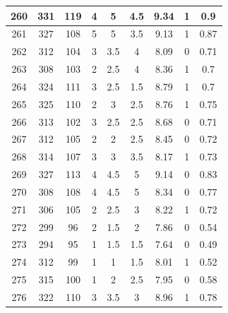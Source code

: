 \documentclass[11pt]{article}
\begin{document}
\begin{appendix}
\begin{longtable}[H]{|c|c|c|c|c|c|c|c|c|}
	260        & 331       & 119         & 4                 & 5   & 4.5 & 9.34 & 1        & 0.9             \\ \hline
	261        & 327       & 108         & 5                 & 5   & 3.5 & 9.13 & 1        & 0.87            \\ \hline
	262        & 312       & 104         & 3                 & 3.5 & 4   & 8.09 & 0        & 0.71            \\ \hline
	263        & 308       & 103         & 2                 & 2.5 & 4   & 8.36 & 1        & 0.7             \\ \hline
	264        & 324       & 111         & 3                 & 2.5 & 1.5 & 8.79 & 1        & 0.7             \\ \hline
	265        & 325       & 110         & 2                 & 3   & 2.5 & 8.76 & 1        & 0.75            \\ \hline
	266        & 313       & 102         & 3                 & 2.5 & 2.5 & 8.68 & 0        & 0.71            \\ \hline
	267        & 312       & 105         & 2                 & 2   & 2.5 & 8.45 & 0        & 0.72            \\ \hline
	268        & 314       & 107         & 3                 & 3   & 3.5 & 8.17 & 1        & 0.73            \\ \hline
	269        & 327       & 113         & 4                 & 4.5 & 5   & 9.14 & 0        & 0.83            \\ \hline
	270        & 308       & 108         & 4                 & 4.5 & 5   & 8.34 & 0        & 0.77            \\ \hline
	271        & 306       & 105         & 2                 & 2.5 & 3   & 8.22 & 1        & 0.72            \\ \hline
	272        & 299       & 96          & 2                 & 1.5 & 2   & 7.86 & 0        & 0.54            \\ \hline
	273        & 294       & 95          & 1                 & 1.5 & 1.5 & 7.64 & 0        & 0.49            \\ \hline
	274        & 312       & 99          & 1                 & 1   & 1.5 & 8.01 & 1        & 0.52            \\ \hline
	275        & 315       & 100         & 1                 & 2   & 2.5 & 7.95 & 0        & 0.58            \\ \hline
	276        & 322       & 110         & 3                 & 3.5 & 3   & 8.96 & 1        & 0.78            \\ \hline

\end{longtable}
\end{appendix}
\end{document}
